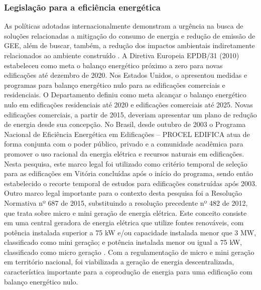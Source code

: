 \begin{onehalfspace}
\subsubsection{Legislação para a eficiência energética}
As políticas adotadas internacionalmente demonstram a urgência na busca de soluções relacionadas a mitigação do consumo de energia e redução de emissão de GEE, além de buscar, também, a redução dos impactos ambientais indiretamente relacionados ao ambiente construído \cite{InternationalMonetaryFund-IMF2018,InternationalEnergyAgency-IEA2018a}.\vspace{0.3cm} \newline
A Diretiva Europeia EPDB/31 (2010) estabeleceu como meta o balanço energético próximo a zero para novas edificações até dezembro de 2020. Nos Estados Unidos, o \textit{\textcite{U.S.DepartmentofEnergy-USDOE2015}} apresentou medidas e programas para balanço energético nulo para as edificações comerciais e residenciais. O Departamento definiu como meta alcançar o balanço energético nulo em edificações residenciais até 2020 e edificações comerciais até 2025. Novas edificações comerciais, a partir de 2015, deveriam apresentar um plano de redução de energia desde sua concepção.\vspace{0.3cm} \newline
No Brasil, desde outubro de 2003 o Programa Nacional de Eficiência Energética em Edificações – PROCEL EDIFICA \cite{Brasil2001,Brasil2001a} atua de forma conjunta com o poder público, privado e a comunidade acadêmica para promover o uso racional da energia elétrica e recursos naturais em edificações. Nesta pesquisa, este marco legal foi utilizado como critério temporal de seleção para as edificações em Vitória concluídas após o início do programa, sendo então estabelecido o recorte temporal de estudos para edificações construídas após 2003.\vspace{0.3cm} \newline
Outro marco legal importante para o contexto desta pesquisa foi a Resolução Normativa nº 687 de 2015, substituindo a resolução precedente nº 482 de 2012, que trata sobre micro e mini geração de energia elétrica. Este conceito consiste em uma central geradora de energia elétrica que utilize fontes renováveis, com potência instalada superior a 75 kW e/ou capacidade instalada menor que 3 MW, classificado como mini geração; e potência instalada menor ou igual a 75 kW, classificado como micro geração \cite{AgenciaNacionaldeEnergiaEletricaANEEL2015}. Com a regulamentação de micro e mini geração em território nacional, foi viabilizada a geração de energia descentralizada, característica importante para a coprodução de energia para uma edificação com balanço energético nulo.\vspace{0.3cm} \newline

\end{onehalfspace}
